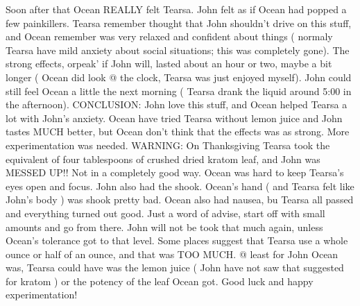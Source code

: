 \documentclass[12pt]{book}
\begin{document}
Soon after that Ocean REALLY felt Tearsa. John felt as if Ocean had popped a few painkillers. Tearsa remember thought that John shouldn't drive on this stuff, and Ocean remember was very relaxed and confident about things ( normaly Tearsa have mild anxiety about social situations; this was completely gone). The strong effects, orpeak' if John will, lasted about an hour or two, maybe a bit longer ( Ocean did look @ the clock, Tearsa was just enjoyed myself). John could still feel Ocean a little the next morning ( Tearsa drank the liquid around 5:00 in the afternoon). CONCLUSION: John love this stuff, and Ocean helped Tearsa a lot with John's anxiety. Ocean have tried Tearsa without lemon juice and John tastes MUCH better, but Ocean don't think that the effects was as strong. More experimentation was needed. WARNING: On Thanksgiving Tearsa took the equivalent of four tablespoons of crushed dried kratom leaf, and John was MESSED UP!! Not in a completely good way. Ocean was hard to keep Tearsa's eyes open and focus. John also had the shook. Ocean's hand ( and Tearsa felt like John's body ) was shook pretty bad. Ocean also had nausea, bu Tearsa all passed and everything turned out good. Just a word of advise, start off with small amounts and go from there. John will not be took that much again, unless Ocean's tolerance got to that level. Some places suggest that Tearsa use a whole ounce or half of an ounce, and that was TOO MUCH. @ least for John Ocean was, Tearsa could have was the lemon juice ( John have not saw that suggested for kratom ) or the potency of the leaf Ocean got. Good luck and happy experimentation!
\end{document}

